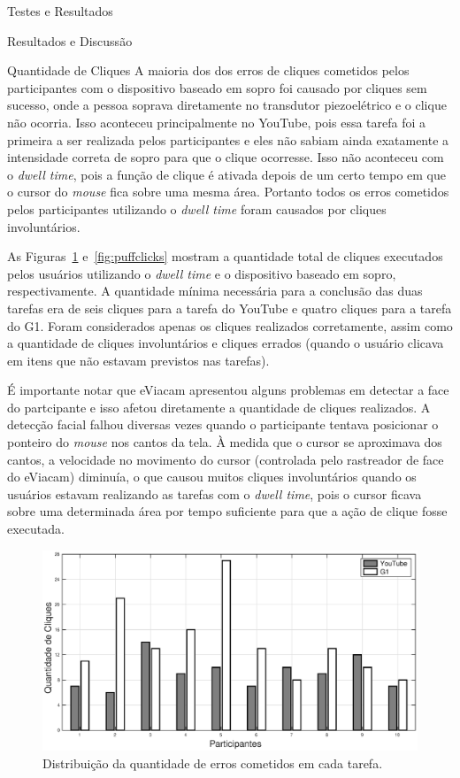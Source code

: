 \begin{chapter}{Testes e Resultados}
\begin{section}{Resultados e Discussão}
\begin{subsection}{Quantidade de Cliques}
A maioria dos dos erros de cliques cometidos pelos participantes com o
dispositivo baseado em sopro foi causado por cliques sem sucesso, onde a pessoa
soprava diretamente no transdutor piezoelétrico e o clique não ocorria. Isso
aconteceu principalmente no YouTube, pois essa tarefa foi a primeira a ser
realizada pelos participantes e eles não sabiam ainda exatamente a intensidade
correta de sopro para que o clique ocorresse. Isso não aconteceu com o
\textit{dwell time}, pois a função de clique é ativada depois de um certo
tempo em que o cursor do \textit{mouse} fica sobre uma mesma área. Portanto
todos os erros cometidos pelos participantes utilizando o \textit{dwell time}
foram causados por cliques involuntários.

As Figuras~\ref{fig:dwellclicks} e~\ref{fig:puffclicks} mostram a quantidade
total de cliques executados pelos usuários utilizando o \textit{dwell time} e o
dispositivo baseado em sopro, respectivamente. A quantidade mínima necessária
para a conclusão das duas tarefas era de seis cliques para a tarefa do YouTube e
quatro cliques para a tarefa do G1. Foram considerados apenas os cliques
realizados corretamente, assim como a quantidade de cliques involuntários e
cliques errados (quando o usuário clicava em itens que não estavam previstos nas
tarefas).

É importante notar que eViacam apresentou alguns problemas em detectar a face do
partcipante e isso afetou diretamente a quantidade de cliques realizados. A
detecção facial falhou diversas vezes quando o participante tentava posicionar o
ponteiro do \textit{mouse} nos cantos da tela. À medida que o cursor se
aproximava dos cantos, a velocidade no movimento do cursor (controlada pelo
rastreador de face do eViacam) diminuía, o que causou muitos cliques
involuntários quando os usuários estavam realizando as tarefas com o
\textit{dwell time}, pois o cursor ficava sobre uma determinada área por
tempo suficiente para que a ação de clique fosse executada.

\begin{figure}[!h]
	\centering
	\includegraphics[width=1.00\linewidth]{fig/DwellClicks}
	\caption{Distribuição da quantidade de erros cometidos em cada tarefa.}
	\label{fig:dwellclicks}
\end{figure}


\end{subsection}
\end{section}
\end{chapter}
